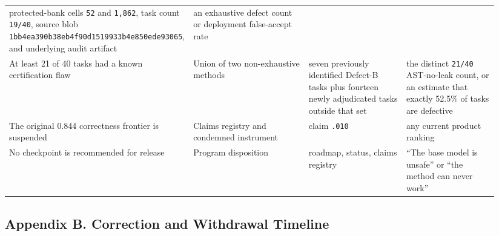 \documentclass[
]{article}
\begin{document}
{\begin{longtable}[]{@{}p{0.28\linewidth}p{0.25\linewidth}p{0.21\linewidth}p{0.20\linewidth}@{}}
protected-bank cells \texttt{52} and \texttt{1,862}, task count
\texttt{19/40}, source blob
\texttt{1bb4ea390b38eb4f90d1519933b4e850ede93065}, and underlying audit
artifact & an exhaustive defect count or deployment false-accept rate \\
At least 21 of 40 tasks had a known certification flaw & Union of two
non-exhaustive methods & seven previously identified Defect-B tasks plus
fourteen newly adjudicated tasks outside that set & the distinct
\texttt{21/40} AST-no-leak count, or an estimate that exactly 52.5\% of
tasks are defective \\
The original 0.844 correctness frontier is suspended & Claims registry
and condemned instrument & claim \texttt{.010} & any current product
ranking \\
No checkpoint is recommended for release & Program disposition &
roadmap, status, claims registry & ``The base model is unsafe'' or ``the
method can never work'' \\
\end{longtable}
}

\subsection{Appendix B. Correction and Withdrawal
Timeline}\label{appendix-b-correction-and-withdrawal-timeline}
\end{document}
